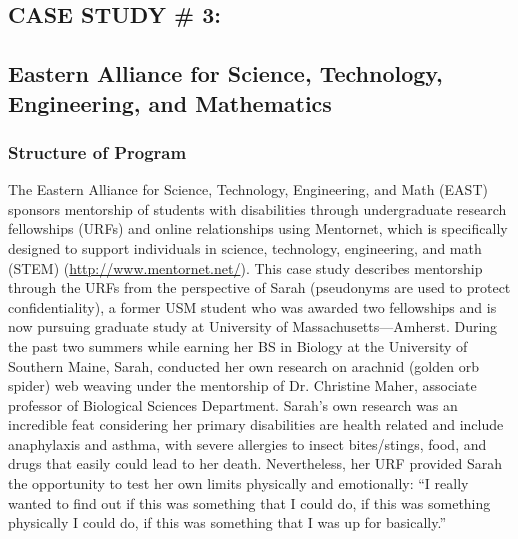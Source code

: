 \documentclass[11.5pt]{sig-alternate} %
\begin{document}
\begin{large}
\section*{CASE STUDY \# 3:}
\subsection*{Eastern Alliance for Science, Technology, Engineering, and Mathematics}
\subsubsection*{Structure of Program}
The Eastern Alliance for Science, Technology, Engineering, and Math (EAST) sponsors mentorship of students with disabilities through undergraduate research fellowships (URFs) and online relationships using Mentornet, which is specifically designed to support individuals in science, technology, engineering, and math (STEM) (\url{http://www.mentornet.net/}). This case study describes mentorship through the URFs from the perspective of Sarah (pseudonyms are used to protect confidentiality), a former USM student who was awarded two fellowships and is now pursuing graduate study at University of Massachusetts—Amherst. During the past two summers while earning her BS in Biology at the University of Southern Maine, Sarah, conducted her own research on arachnid (golden orb spider) web weaving under the mentorship of Dr. Christine Maher, associate professor of Biological Sciences Department. Sarah's own research was an incredible feat considering her primary disabilities are health related and include anaphylaxis and asthma, with severe allergies to insect bites/stings, food, and drugs that easily could lead to her death. Nevertheless, her URF provided Sarah the opportunity to test her own limits physically and emotionally: “I really wanted to find out if this was something that I could do, if this was something physically I could do, if this was something that I was up for basically.”


\end{large}
\end{document}
